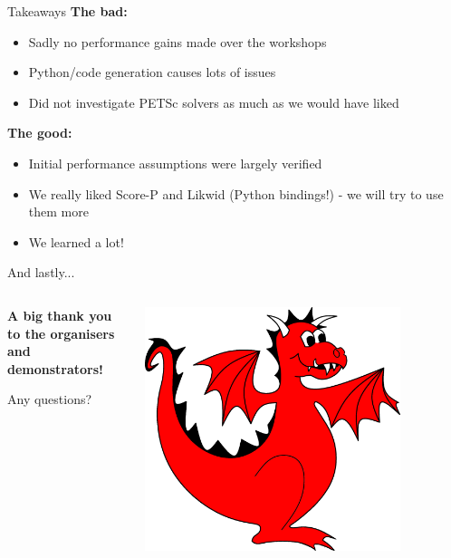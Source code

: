 \documentclass[pdf,aspectratio=169]{beamer}
\begin{document}
\begin{frame}{Takeaways}
  \textbf{The bad:}
  \begin{itemize}
    \item Sadly no performance gains made over the workshops
    \item Python/code generation causes lots of issues
    \item Did not investigate PETSc solvers as much as we would have liked
  \end{itemize}
  
  \vspace{1em}

  \textbf{The good:}
  \begin{itemize}
    \item Initial performance assumptions were largely verified
    \item We really liked Score-P and Likwid (Python bindings!) - we will try to use them more
    \item We learned a lot!
  \end{itemize}
\end{frame}

\begin{frame}{And lastly...}
  \begin{columns}[T]
    \begin{column}{0.45\textwidth}
      \begin{center}
	\vspace{3.5em}

	\textbf{A big thank you to the organisers and demonstrators!}

	\vspace{2em}

	Any questions?
      \end{center}
    \end{column}
    \begin{column}[T]{0.45\textwidth}
      \includegraphics[width=0.8\textwidth]{firedrake}
    \end{column}
  \end{columns}
\end{frame}
\end{document}
